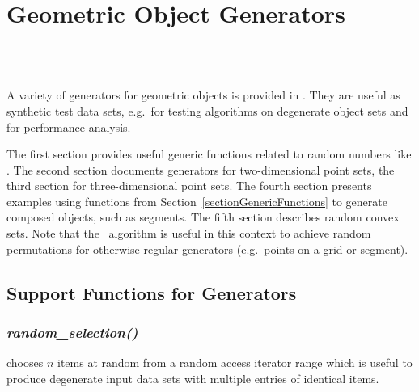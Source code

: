 
\ccParDims

\chapter{Geometric Object Generators}
\label{chapterGenerators}
\\
\\


A variety of generators for geometric objects is provided in \cgal.
They are useful as synthetic test data sets, e.g.~for testing
algorithms on degenerate object sets and for performance analysis.

The first section provides useful generic functions related to random
numbers like . The second section
documents generators for two-dimensional point sets, the third section
for three-dimensional point sets. The fourth section presents examples
using functions from Section~\ref{sectionGenericFunctions} to generate
composed objects, such as segments.  The fifth section describes
random convex sets.  Note that the \stl\ algorithm
 is useful in this context to achieve random
permutations for otherwise regular generators (e.g.~points on a grid
or segment).

\section{Support Functions for Generators}


\subsection{{\it random\_selection()}}
\label{sectionRandomSelection}

 chooses $n$ items at random from a random
access iterator range which is useful to produce degenerate input data
sets with multiple entries of identical items.

